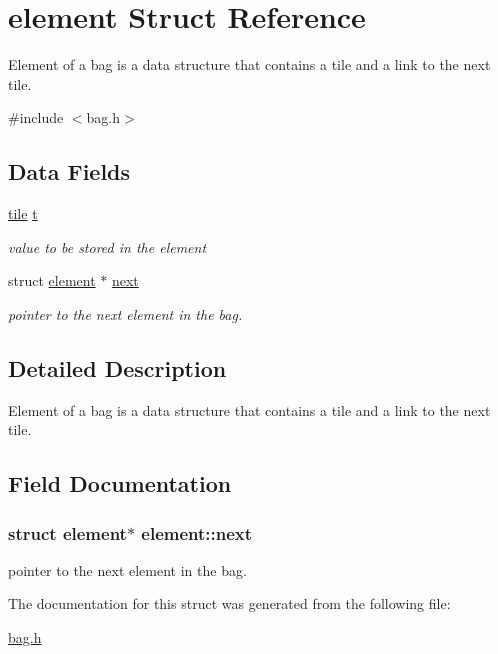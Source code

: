 \hypertarget{structelement}{\section{element Struct Reference}
\label{structelement}
}


Element of a bag is a data structure that contains a tile and a link to the next tile.  




{\ttfamily \#include $<$bag.\-h$>$}

\subsection*{Data Fields}
\begin{DoxyCompactItemize}
\item 
\hypertarget{structelement_a1510a0076f3995e9810c8baa02739500}{\hyperlink{structtile}{tile} \hyperlink{structelement_a1510a0076f3995e9810c8baa02739500}{t}}\label{structelement_a1510a0076f3995e9810c8baa02739500}

\begin{DoxyCompactList}\small\item\em value to be stored in the element \end{DoxyCompactList}\item 
struct \hyperlink{structelement}{element} $\ast$ \hyperlink{structelement_aaafe0042496c2573c14b8f5c6be41edb}{next}
\begin{DoxyCompactList}\small\item\em pointer to the next element in the bag. \end{DoxyCompactList}\end{DoxyCompactItemize}


\subsection{Detailed Description}
Element of a bag is a data structure that contains a tile and a link to the next tile. 

\subsection{Field Documentation}
\hypertarget{structelement_aaafe0042496c2573c14b8f5c6be41edb}{
\subsubsection[{next}]{\setlength{\rightskip}{0pt plus 5cm}struct {\bf element}$\ast$ element\-::next}}\label{structelement_aaafe0042496c2573c14b8f5c6be41edb}


pointer to the next element in the bag. 



The documentation for this struct was generated from the following file\-:\begin{DoxyCompactItemize}
\item 
\hyperlink{bag_8h}{bag.\-h}\end{DoxyCompactItemize}
